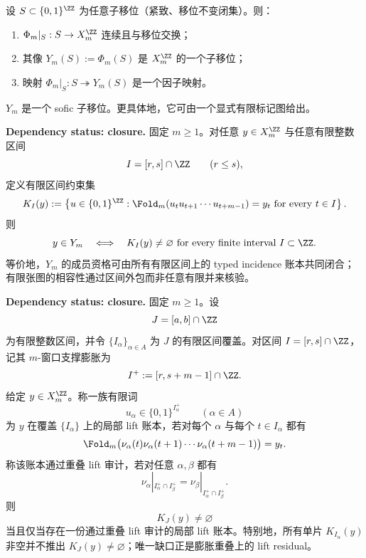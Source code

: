 \begin{proposition}\label{prop:Phi_m-factor-on-subshift}
设 $S\subset\{0,1\}^{\ZZ}$ 为任意子移位（紧致、移位不变闭集）。则：
\begin{enumerate}
  \item $\Phi_m|_S:S\to X_m^{\ZZ}$ 连续且与移位交换；
  \item 其像 $Y_m(S):=\Phi_m(S)$ 是 $X_m^{\ZZ}$ 的一个子移位；
  \item 映射 $\Phi_m|_S:S\twoheadrightarrow Y_m(S)$ 是一个因子映射。
\end{enumerate}
\end{proposition}

\begin{proposition}\label{prop:Y_m-sofic}
$Y_m$ 是一个 sofic 子移位。更具体地，它可由一个显式有限标记图给出。
\end{proposition}

\begin{proposition}\label{prop:distill-euclid-elements-phi-finite-interval-ledger-compactness}
\textbf{Dependency status: closure.}
固定 \(m\ge1\)。对任意 \(y\in X_m^{\ZZ}\) 与任意有限整数区间
\[
I=[r,s]\cap\ZZ
\qquad(r\le s),
\]
定义有限区间约束集
\[
K_I(y):=\left\{u\in\{0,1\}^{\ZZ}:
\Fold_m(u_tu_{t+1}\cdots u_{t+m-1})=y_t\ \text{for every }t\in I
\right\}.
\]
则
\[
y\in Y_m
\quad\Longleftrightarrow\quad
K_I(y)\ne\varnothing\ \text{for every finite interval }I\subset\ZZ.
\]
等价地，\(Y_m\) 的成员资格可由所有有限区间上的 typed incidence 账本共同闭合；有限张图的相容性通过区间外包而非任意有限并来核验。
\end{proposition}

\begin{proposition}\label{distill:euclid_elements-lifted_congruence_and_residual_rigidity_families-phi-local-window-overlap-lift-audit}
\textbf{Dependency status: closure.}
固定 \(m\ge1\)。设
\[
J=[a,b]\cap\ZZ
\]
为有限整数区间，并令 \(\{I_\alpha\}_{\alpha\in A}\) 为 \(J\) 的有限区间覆盖。对区间
\(I=[r,s]\cap\ZZ\)，记其 \(m\)-窗口支撑膨胀为
\[
I^{+}:=[r,s+m-1]\cap\ZZ.
\]
给定 \(y\in X_m^{\ZZ}\)。称一族有限词
\[
u_\alpha\in\{0,1\}^{I_\alpha^{+}}\qquad(\alpha\in A)
\]
为 \(y\) 在覆盖 \(\{I_\alpha\}\) 上的局部 lift 账本，若对每个 \(\alpha\) 与每个
\(t\in I_\alpha\) 都有
\[
\Fold_m\bigl(\nu_\alpha(t)\nu_\alpha(t+1)\cdots\nu_\alpha(t+m-1)\bigr)=y_t.
\]
称该账本通过重叠 lift 审计，若对任意 \(\alpha,\beta\) 都有
\[
\nu_\alpha|_{I_\alpha^{+}\cap I_\beta^{+}}
=
\nu_\beta|_{I_\alpha^{+}\cap I_\beta^{+}}.
\]
则
\[
K_J(y)\ne\varnothing
\]
当且仅当存在一份通过重叠 lift 审计的局部 lift 账本。特别地，所有单片 \(K_{I_\alpha}(y)\) 非空并不推出 \(K_J(y)\ne\varnothing\)；唯一缺口正是膨胀重叠上的 lift residual。
\end{proposition}

